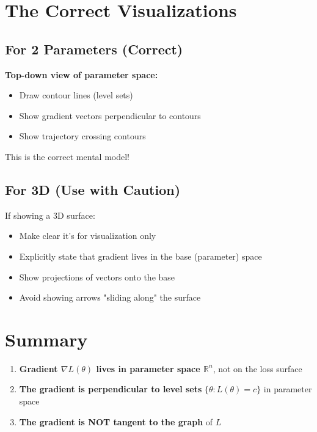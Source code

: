 \begin{notechapter}
\section{The Correct Visualizations}

\subsection{For 2 Parameters (Correct)}

\textbf{Top-down view of parameter space:}
\begin{itemize}
    \item Draw contour lines (level sets)
    \item Show gradient vectors perpendicular to contours
    \item Show trajectory crossing contours
\end{itemize}

This is the correct mental model!

\subsection{For 3D (Use with Caution)}

If showing a 3D surface:
\begin{itemize}
    \item Make clear it's for visualization only
    \item Explicitly state that gradient lives in the base (parameter) space
    \item Show projections of vectors onto the base
    \item Avoid showing arrows "sliding along" the surface
\end{itemize}

\section{Summary}

\begin{enumerate}
    \item \textbf{Gradient $\nabla L(\theta)$ lives in parameter space
    $\mathbb{R}^n$}, not on the loss surface
    
    \item \textbf{The gradient is perpendicular to level sets}
    $\{\theta : L(\theta) = c\}$ in parameter space
    
    \item \textbf{The gradient is NOT tangent to the graph} of $L$
    

\end{enumerate}
\end{notechapter}
